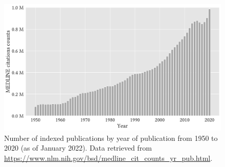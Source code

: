 \begin{figure}[!tb]
\begin{center}
\includegraphics[width=\textwidth]{img/medline/v2/img.pdf}
\caption[Number of  indexed publications by year of publication.]{Number of  indexed publications by year of publication from 1950 to 2020 (as of January 2022). Data retrieved from \url{https://www.nlm.nih.gov/bsd/medline_cit_counts_yr_pub.html}.}
\label{fig:medline}
\end{center}
\end{figure}
